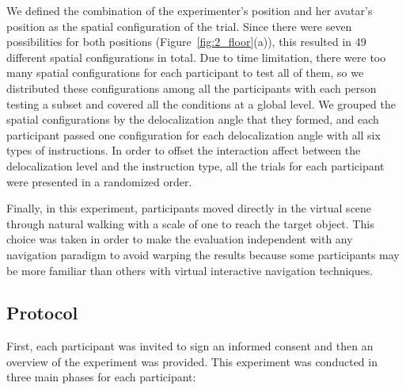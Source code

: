 We defined the combination of the experimenter's position and her avatar's position as the spatial configuration of the trial. Since there were seven possibilities for both positions (Figure~\ref{fig:2_floor}(a)), this resulted in 49 different spatial configurations in total. Due to time limitation, there were too many spatial configurations for each participant to test all of them, so we distributed these configurations among all the participants with each person testing a subset and covered all the conditions at a global level. We grouped the spatial configurations by the delocalization angle that they formed, and each participant passed one configuration for each delocalization angle with all six types of instructions. In order to offset the interaction affect between the delocalization level and the instruction type, all the trials for each participant were presented in a randomized order.

Finally, in this experiment, participants moved directly in the virtual scene through natural walking with a scale of one to reach the target object. This choice was taken in order to make the evaluation independent with any navigation paradigm to avoid warping the results because some participants may be more familiar than others with virtual interactive navigation techniques.


\subsection{Protocol}
First, each participant was invited to sign an informed consent and then an overview of the experiment was provided. This experiment was conducted in three main phases for each participant:

